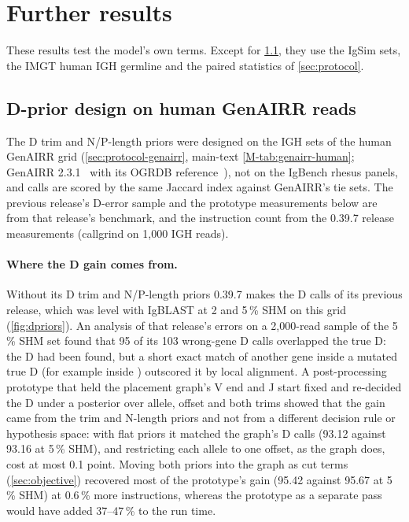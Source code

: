 \documentclass[11pt,a4paper]{article}
\begin{document}
\section{Further results}
\label{sec:supresults}

These results test the model's own terms. Except for \cref{sec:dpriors},
they use the IgSim sets, the IMGT human IGH germline and the paired
statistics of \cref{sec:protocol}.

\subsection{D-prior design on human GenAIRR reads}
\label{sec:dpriors}

The D trim and N/P-length priors were designed on the IGH sets of the human
GenAIRR grid (\cref{sec:protocol-genairr}, main-text
\cref{M-tab:genairr-human}; GenAIRR 2.3.1~\cite{konstantinovsky2024genairr}
with its OGRDB reference~\cite{lees2020ogrdb}), not on the IgBench rhesus
panels, and calls are scored by the same Jaccard index against GenAIRR's tie
sets. The previous release's D-error sample and the prototype measurements
below are from that release's benchmark, and the instruction count from the
0.39.7 release measurements (callgrind on 1,000 IGH reads).

\paragraph{Where the D gain comes from.} Without its D trim and N/P-length
priors \swig{} 0.39.7 makes the D calls of its previous release, which was
level with IgBLAST at 2 and 5\,\% SHM on this grid (\cref{fig:dpriors}). An analysis of that release's errors on a
2,000-read sample of the 5\,\% SHM set found that 95 of its 103 wrong-gene D
calls overlapped the true D: the D had been found, but a short exact match of
another gene inside a mutated true D (for example  inside
) outscored it by local alignment. A post-processing
prototype that held the placement graph's V end and J start fixed and
re-decided the D under a posterior over allele, offset and both trims showed
that the gain came from the trim and N-length priors and not from a
different decision rule or hypothesis space: with flat priors it matched the
graph's D calls (93.12 against 93.16 at 5\,\% SHM), and restricting each
allele to one offset, as the graph does, cost at most 0.1 point. Moving both
priors into the graph as cut terms (\cref{sec:objective}) recovered most of
the prototype's gain (95.42 against 95.67 at 5\,\% SHM) at 0.6\,\% more
instructions, whereas the prototype as a separate pass would have added
37--47\,\% to the run time.
\end{document}
